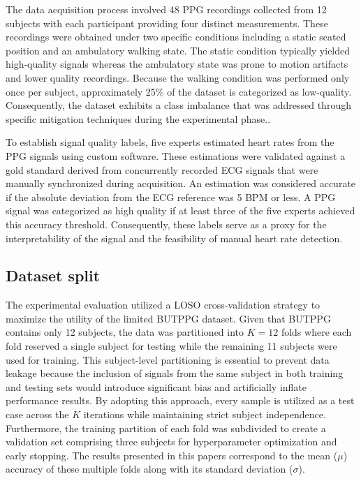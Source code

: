 \documentclass[final,3p,times,twocolumn]{elsarticle}
\begin{document}
The data acquisition process involved 48 \gls{PPG} recordings collected from 12 subjects with each participant providing four distinct measurements.
These recordings were obtained under two specific conditions including a static seated position and an ambulatory walking state.
The static condition typically yielded high-quality signals whereas the ambulatory state was prone to motion artifacts and lower quality recordings.
Because the walking condition was performed only once per subject, approximately 25\% of the dataset is categorized as low-quality.
Consequently, the dataset exhibits a class imbalance that was addressed through specific mitigation techniques during the experimental phase..


To establish signal quality labels, five experts estimated heart rates from the \gls{PPG} signals using custom software.
These estimations were validated against a gold standard derived from concurrently recorded \gls{ECG} signals that were manually synchronized during acquisition.
An estimation was considered accurate if the absolute deviation from the \gls{ECG} reference was 5 \gls{BPM} or less.
A \gls{PPG} signal was categorized as high quality if at least three of the five experts achieved this accuracy threshold.
Consequently, these labels serve as a proxy for the interpretability of the signal and the feasibility of manual heart rate detection.




\subsection{Dataset split}


The experimental evaluation utilized a \gls{LOSO} cross-validation strategy to maximize the utility of the limited \gls{BUTPPG} dataset. 
Given that \gls{BUTPPG} contains only 12 subjects, the data was partitioned into $K=12$ folds where each fold reserved a single subject for testing while the remaining 11 subjects were used for training.
This subject-level partitioning is essential to prevent data leakage because the inclusion of signals from the same subject in both training and testing sets would introduce significant bias and artificially inflate performance results.
By adopting this approach, every sample is utilized as a test case across the $K$ iterations while maintaining strict subject independence.
Furthermore, the training partition of each fold was subdivided to create a validation set comprising three subjects for hyperparameter optimization and early stopping.
The results presented in this papers correspond to the mean ($\mu$) accuracy of these multiple folds along with its standard deviation ($\sigma$).
\end{document}
